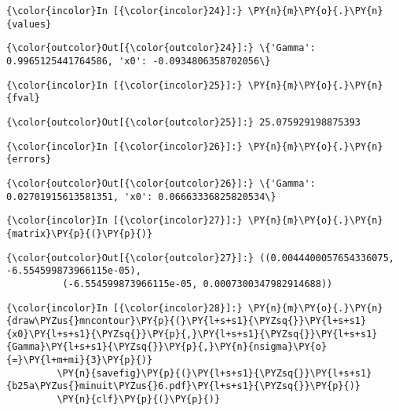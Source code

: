     \begin{Verbatim}[commandchars=\\\{\}]
{\color{incolor}In [{\color{incolor}24}]:} \PY{n}{m}\PY{o}{.}\PY{n}{values}
\end{Verbatim}


\begin{Verbatim}[commandchars=\\\{\}]
{\color{outcolor}Out[{\color{outcolor}24}]:} \{'Gamma': 0.9965125441764586, 'x0': -0.0934806358702056\}
\end{Verbatim}
            
    \begin{Verbatim}[commandchars=\\\{\}]
{\color{incolor}In [{\color{incolor}25}]:} \PY{n}{m}\PY{o}{.}\PY{n}{fval}
\end{Verbatim}


\begin{Verbatim}[commandchars=\\\{\}]
{\color{outcolor}Out[{\color{outcolor}25}]:} 25.075929198875393
\end{Verbatim}
            
    \begin{Verbatim}[commandchars=\\\{\}]
{\color{incolor}In [{\color{incolor}26}]:} \PY{n}{m}\PY{o}{.}\PY{n}{errors}
\end{Verbatim}


\begin{Verbatim}[commandchars=\\\{\}]
{\color{outcolor}Out[{\color{outcolor}26}]:} \{'Gamma': 0.02701915613581351, 'x0': 0.06663336825820534\}
\end{Verbatim}
            
    \begin{Verbatim}[commandchars=\\\{\}]
{\color{incolor}In [{\color{incolor}27}]:} \PY{n}{m}\PY{o}{.}\PY{n}{matrix}\PY{p}{(}\PY{p}{)}
\end{Verbatim}


\begin{Verbatim}[commandchars=\\\{\}]
{\color{outcolor}Out[{\color{outcolor}27}]:} ((0.0044400057654336075, -6.554599873966115e-05),
          (-6.554599873966115e-05, 0.0007300347982914688))
\end{Verbatim}
            
    \begin{Verbatim}[commandchars=\\\{\}]
{\color{incolor}In [{\color{incolor}28}]:} \PY{n}{m}\PY{o}{.}\PY{n}{draw\PYZus{}mncontour}\PY{p}{(}\PY{l+s+s1}{\PYZsq{}}\PY{l+s+s1}{x0}\PY{l+s+s1}{\PYZsq{}}\PY{p}{,}\PY{l+s+s1}{\PYZsq{}}\PY{l+s+s1}{Gamma}\PY{l+s+s1}{\PYZsq{}}\PY{p}{,}\PY{n}{nsigma}\PY{o}{=}\PY{l+m+mi}{3}\PY{p}{)}
         \PY{n}{savefig}\PY{p}{(}\PY{l+s+s1}{\PYZsq{}}\PY{l+s+s1}{b25a\PYZus{}minuit\PYZus{}6.pdf}\PY{l+s+s1}{\PYZsq{}}\PY{p}{)}
         \PY{n}{clf}\PY{p}{(}\PY{p}{)}
\end{Verbatim}


